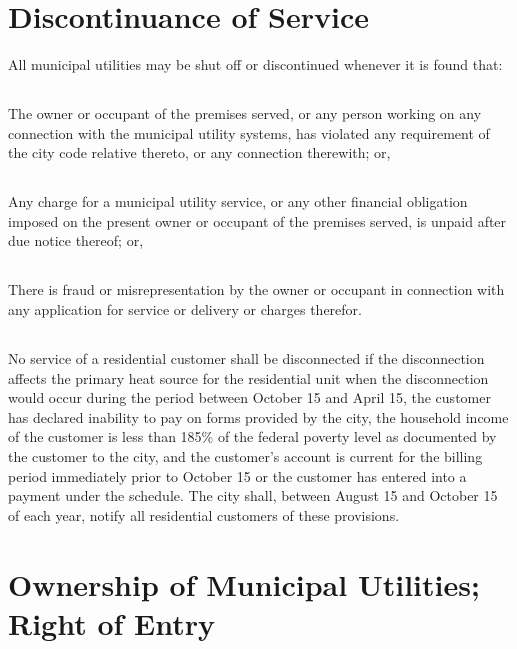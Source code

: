 \section{Discontinuance of Service}
All municipal utilities may be shut off or discontinued whenever it is found that:
\subsection{}
The owner or occupant of the premises served, or any person working on any connection with the municipal utility systems, has violated any requirement of the city code relative thereto, or any connection therewith; or,
\subsection{}
Any charge for a municipal utility service, or any other financial obligation imposed on the present owner or occupant of the premises served, is unpaid after due notice thereof; or,
\subsection{}
There is fraud or misrepresentation by the owner or occupant in connection with any application for service or delivery or charges therefor.
\subsection{}
No service of a residential customer shall be disconnected if the disconnection affects the primary heat source for the residential unit when the disconnection would occur during the period between October 15 and April 15, the customer has declared inability to pay on forms provided by the city, the household income of the customer is less than 185\% of the federal poverty level as documented by the customer to the city, and the customer’s account is current for the billing period immediately prior to October 15 or the customer has entered into a payment under the schedule.  The city shall, between August 15 and October 15 of each year, notify all residential customers of these provisions.

\section{Ownership of Municipal Utilities; Right of Entry}

